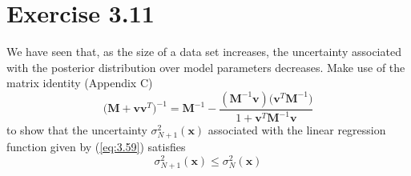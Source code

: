 \section*{Exercise 3.11}
We have seen that, as the size of a data set increases, the uncertainty associated
with the posterior distribution over model parameters decreases. Make use of the
matrix identity (Appendix C)
\begin{equation}\label{eq:3.110}\tag{3.110}
    \big(\mathbf{M} + \mathbf{v}\mathbf{v}^T\big)^{-1}
    = \mathbf{M}^{-1} - \frac{(\mathbf{M}^{-1}\mathbf{v})\big(\mathbf{v}^T\mathbf{M}^{-1}\big)}
        {1 + \mathbf{v}^T\mathbf{M}^{-1}\mathbf{v}}
\end{equation}
to show that the uncertainty $\sigma^2_{N + 1}(\mathbf{x})$ associated with the
linear regression function given by (\ref{eq:3.59}) satisfies
\begin{equation}\label{eq:3.111}\tag{3.111}
    \sigma^2_{N + 1}(\mathbf{x}) \leq \sigma^2_N(\mathbf{x})
\end{equation}

\vspace{1em}


